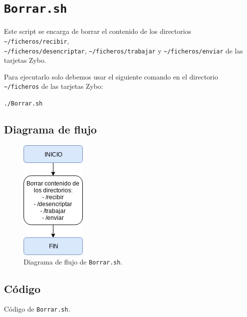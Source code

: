 \section{\texttt{Borrar.sh}}
Este script se encarga de borrar el contenido de los directorios \texttt{\textasciitilde/ficheros/recibir},\\ \texttt{\textasciitilde/ficheros/desencriptar}, \texttt{\textasciitilde/ficheros/trabajar} y \texttt{\textasciitilde/ficheros/enviar} de las tarjetas Zybo.

Para ejecutarlo solo debemos usar el siguiente comando en el directorio \texttt{\textasciitilde/ficheros} de las tarjetas Zybo:
\begin{center}
	\texttt{./Borrar.sh}
\end{center}

\subsection{Diagrama de flujo}
\begin{figure}[h]
	\centering
	\includegraphics[scale=0.9]{Anexos/Anexo3/Diagramas/Borrar.png}
	\caption{Diagrama de flujo de \texttt{Borrar.sh}.}
	\label{Diagrama de flujo de Borrar.sh}
\end{figure}

\subsection{Código}

\begin{center}
	Código de \texttt{Borrar.sh}.
\end{center}